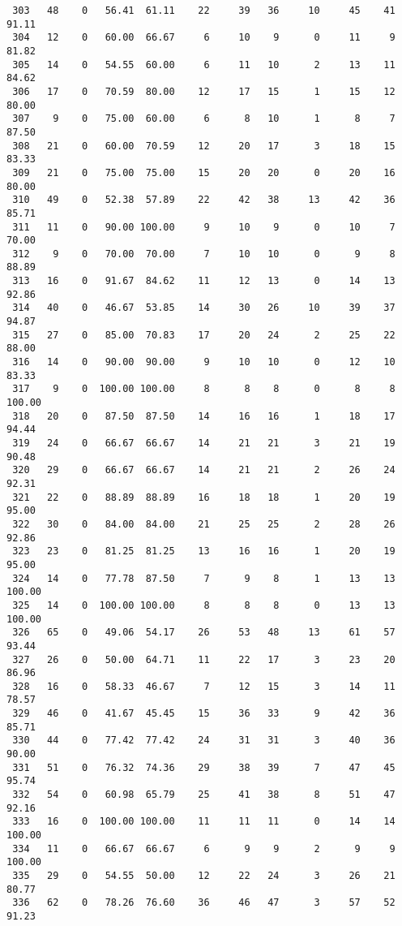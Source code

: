 \begin{verbatim}
 303   48    0   56.41  61.11    22     39   36     10     45    41    91.11
 304   12    0   60.00  66.67     6     10    9      0     11     9    81.82
 305   14    0   54.55  60.00     6     11   10      2     13    11    84.62
 306   17    0   70.59  80.00    12     17   15      1     15    12    80.00
 307    9    0   75.00  60.00     6      8   10      1      8     7    87.50
 308   21    0   60.00  70.59    12     20   17      3     18    15    83.33
 309   21    0   75.00  75.00    15     20   20      0     20    16    80.00
 310   49    0   52.38  57.89    22     42   38     13     42    36    85.71
 311   11    0   90.00 100.00     9     10    9      0     10     7    70.00
 312    9    0   70.00  70.00     7     10   10      0      9     8    88.89
 313   16    0   91.67  84.62    11     12   13      0     14    13    92.86
 314   40    0   46.67  53.85    14     30   26     10     39    37    94.87
 315   27    0   85.00  70.83    17     20   24      2     25    22    88.00
 316   14    0   90.00  90.00     9     10   10      0     12    10    83.33
 317    9    0  100.00 100.00     8      8    8      0      8     8   100.00
 318   20    0   87.50  87.50    14     16   16      1     18    17    94.44
 319   24    0   66.67  66.67    14     21   21      3     21    19    90.48
 320   29    0   66.67  66.67    14     21   21      2     26    24    92.31
 321   22    0   88.89  88.89    16     18   18      1     20    19    95.00
 322   30    0   84.00  84.00    21     25   25      2     28    26    92.86
 323   23    0   81.25  81.25    13     16   16      1     20    19    95.00
 324   14    0   77.78  87.50     7      9    8      1     13    13   100.00
 325   14    0  100.00 100.00     8      8    8      0     13    13   100.00
 326   65    0   49.06  54.17    26     53   48     13     61    57    93.44
 327   26    0   50.00  64.71    11     22   17      3     23    20    86.96
 328   16    0   58.33  46.67     7     12   15      3     14    11    78.57
 329   46    0   41.67  45.45    15     36   33      9     42    36    85.71
 330   44    0   77.42  77.42    24     31   31      3     40    36    90.00
 331   51    0   76.32  74.36    29     38   39      7     47    45    95.74
 332   54    0   60.98  65.79    25     41   38      8     51    47    92.16
 333   16    0  100.00 100.00    11     11   11      0     14    14   100.00
 334   11    0   66.67  66.67     6      9    9      2      9     9   100.00
 335   29    0   54.55  50.00    12     22   24      3     26    21    80.77
 336   62    0   78.26  76.60    36     46   47      3     57    52    91.23

\end{verbatim}
